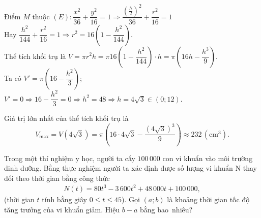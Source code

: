 \documentclass[12pt,a4paper,openany,twoside]{book}
\begin{document}
\begin{bt}
{	Điểm $M$ thuộc $(E)\colon  \dfrac{x^2}{36}+\dfrac{y^2}{16}=1\Rightarrow \dfrac{{\left(\tfrac{h}{2}\right)}^2}{36}+\dfrac{r^2}{16}=1$\\
	Hay  $ \dfrac{h^2}{144}+\dfrac{r^2}{16}=1\Rightarrow r^2=16\left(1-\dfrac{h^2}{144}\right)$.\\
	Thể tích khối trụ là $V=\pi r^2h=\pi16\left(1-\dfrac{h^2}{144}\right)\cdot  h=\pi\left(16h-\dfrac{h^3}{9}\right)$.\\
	Ta có $V'=\pi\left(16-\dfrac{h^2}{3}\right)$; $V'=0\Rightarrow 16-\dfrac{h^2}{3}=0\Rightarrow h^2=48\Rightarrow  h=4\sqrt{3}\in (0;12)$.\\
	\begin{center}
	\end{center}
	Giá trị lớn nhất của thể tích khối trụ là $$V_{\max}=V(4\sqrt{3})=\pi\left(16\cdot 4\sqrt{3}-\dfrac{(4\sqrt{3})^3}{9}\right)\approx 232  \,(\text{cm}^3).$$
 }
\end{bt}
\begin{bt}%
	Trong một thí nghiệm y học, người ta cấy $100\,000$ con vi khuẩn vào môi trường dinh dưỡng. Bằng thực nghiệm người ta xác  định được số lượng vi khuẩn N thay đổi theo thời gian bằng công thức
	\begin{align*}
		N(t)=80  t^3-3\,600 t^2+48\,000 t+100\,000,
	\end{align*}
	(thời gian $t$ tính  bằng giây $0 \leq t \leq 45$). Gọi $(a; b)$ là khoảng thời gian tốc độ tăng trưởng của vi khuẩn giảm. Hiệu $b-a$ bằng bao~nhiêu?
\end{bt}
\end{document}
